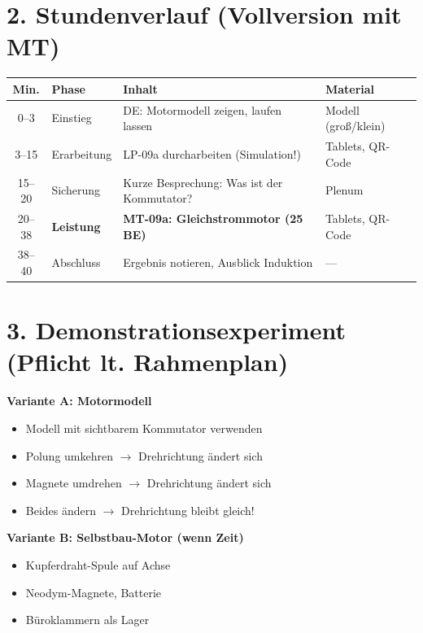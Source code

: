\documentclass[11pt, a4paper]{article}
\newcommand{\stession}{09a}
\begin{document}
\vspace{1em}


\section*{2. Stundenverlauf (Vollversion mit MT)}

\begin{longtable}{|c|p{2cm}|p{7cm}|p{3.5cm}|}
\hline
\textbf{Min.} & \textbf{Phase} & \textbf{Inhalt} & \textbf{Material} \\
\hline
\endhead

0--3 & Einstieg & DE: Motormodell zeigen, laufen lassen & Modell (groß/klein) \\
\hline

3--15 & Erarbeitung & LP-\stession{} durcharbeiten (Simulation!) & Tablets, QR-Code \\
\hline

15--20 & Sicherung & Kurze Besprechung: Was ist der Kommutator? & Plenum \\
\hline

20--38 & \textbf{Leistung} & \textbf{MT-\stession: Gleichstrommotor (25 BE)} & Tablets, QR-Code \\
\hline

38--40 & Abschluss & Ergebnis notieren, Ausblick Induktion & --- \\
\hline
\end{longtable}


\section*{3. Demonstrationsexperiment (Pflicht lt. Rahmenplan)}

\begin{infobox}[DE: Gleichstrommotor]
\textbf{Variante A: Motormodell}
\begin{itemize}
    \item Modell mit sichtbarem Kommutator verwenden
    \item Polung umkehren $\rightarrow$ Drehrichtung ändert sich
    \item Magnete umdrehen $\rightarrow$ Drehrichtung ändert sich
    \item Beides ändern $\rightarrow$ Drehrichtung bleibt gleich!
\end{itemize}

\textbf{Variante B: Selbstbau-Motor (wenn Zeit)}
\begin{itemize}
    \item Kupferdraht-Spule auf Achse
    \item Neodym-Magnete, Batterie
    \item Büroklammern als Lager
\end{itemize}
\end{infobox}
\end{document}
